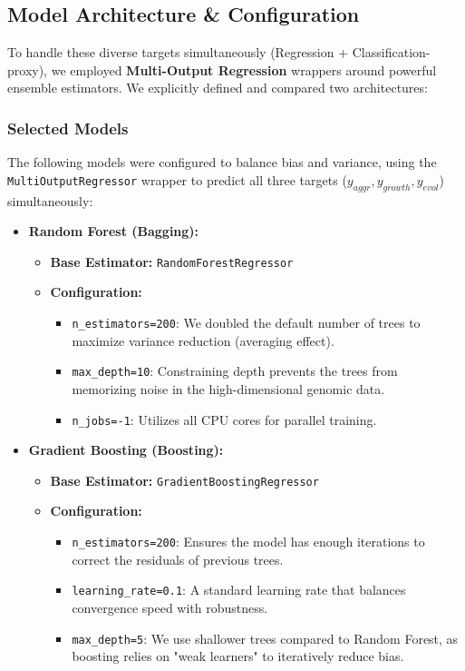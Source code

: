 \subsection{Model Architecture \& Configuration}
To handle these diverse targets simultaneously (Regression + Classification-proxy), we employed \textbf{Multi-Output Regression} wrappers around powerful ensemble estimators. We explicitly defined and compared two architectures:

\subsubsection{Selected Models}
The following models were configured to balance bias and variance, using the \texttt{MultiOutputRegressor} wrapper to predict all three targets ($y_{aggr}, y_{growth}, y_{evol}$) simultaneously:

\begin{itemize}
    \item \textbf{Random Forest (Bagging):}
    \begin{itemize}
        \item \textbf{Base Estimator:} \texttt{RandomForestRegressor}
        \item \textbf{Configuration:}
        \begin{itemize}
            \item \texttt{n\_estimators=200}: We doubled the default number of trees to maximize variance reduction (averaging effect).
            \item \texttt{max\_depth=10}: Constraining depth prevents the trees from memorizing noise in the high-dimensional genomic data.
            \item \texttt{n\_jobs=-1}: Utilizes all CPU cores for parallel training.
        \end{itemize}
    \end{itemize}

    \item \textbf{Gradient Boosting (Boosting):}
    \begin{itemize}
        \item \textbf{Base Estimator:} \texttt{GradientBoostingRegressor}
        \item \textbf{Configuration:}
        \begin{itemize}
            \item \texttt{n\_estimators=200}: Ensures the model has enough iterations to correct the residuals of previous trees.
            \item \texttt{learning\_rate=0.1}: A standard learning rate that balances convergence speed with robustness.
            \item \texttt{max\_depth=5}: We use shallower trees compared to Random Forest, as boosting relies on "weak learners" to iteratively reduce bias.
        \end{itemize}
    \end{itemize}
\end{itemize}

